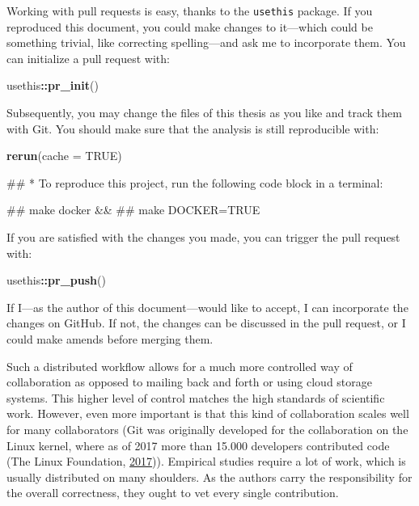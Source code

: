\documentclass[12pt,a4paper,twoside]{article}
\newenvironment{Shaded}{\begin{snugshade}}{\end{snugshade}}
\newcommand{\DataTypeTok}[1]{\textcolor[rgb]{0.13,0.29,0.53}{#1}}
\newcommand{\KeywordTok}[1]{\textcolor[rgb]{0.13,0.29,0.53}{\textbf{#1}}}
\newcommand{\NormalTok}[1]{#1}
\newcommand{\OperatorTok}[1]{\textcolor[rgb]{0.81,0.36,0.00}{\textbf{#1}}}
\newcommand{\OtherTok}[1]{\textcolor[rgb]{0.56,0.35,0.01}{#1}}
\let\oldverbatim\verbatim
\let\endoldverbatim\endverbatim
\renewenvironment{verbatim}{\footnotesize\oldverbatim}{\endoldverbatim}
\begin{document}
Working with pull requests is easy, thanks to the \texttt{usethis} package.
If you reproduced this document, you could make changes to it---which could be something trivial, like correcting spelling---and ask me to incorporate them.
You can initialize a pull request with:

\begin{Shaded}
\begin{Highlighting}[]
\NormalTok{usethis}\OperatorTok{::}\KeywordTok{pr_init}\NormalTok{()}
\end{Highlighting}
\end{Shaded}

Subsequently, you may change the files of this thesis as you like and track them with Git.
You should make sure that the analysis is still reproducible with:

\begin{Shaded}
\begin{Highlighting}[]
\KeywordTok{rerun}\NormalTok{(}\DataTypeTok{cache =} \OtherTok{TRUE}\NormalTok{)}
\end{Highlighting}
\end{Shaded}

\begin{verbatim}
## * To reproduce this project, run the following code block in a terminal:
\end{verbatim}

\begin{verbatim}
##   make docker &&
##   make DOCKER=TRUE
\end{verbatim}

If you are satisfied with the changes you made, you can trigger the pull request with:

\begin{Shaded}
\begin{Highlighting}[]
\NormalTok{usethis}\OperatorTok{::}\KeywordTok{pr_push}\NormalTok{()}
\end{Highlighting}
\end{Shaded}

If I---as the author of this document---would like to accept, I can incorporate the changes on GitHub.
If not, the changes can be discussed in the pull request, or I could make amends before merging them.

Such a distributed workflow allows for a much more controlled way of collaboration as opposed to mailing back and forth or using cloud storage systems.
This higher level of control matches the high standards of scientific work.
However, even more important is that this kind of collaboration scales well for many collaborators (Git was originally developed for the collaboration on the Linux kernel, where as of 2017 more than 15.000 developers contributed code (The Linux Foundation, \protect\hyperlink{ref-thelinuxfoundation2017LinuxKernel2017}{2017})).
Empirical studies require a lot of work, which is usually distributed on many shoulders.
As the authors carry the responsibility for the overall correctness, they ought to vet every single contribution.
\end{document}
